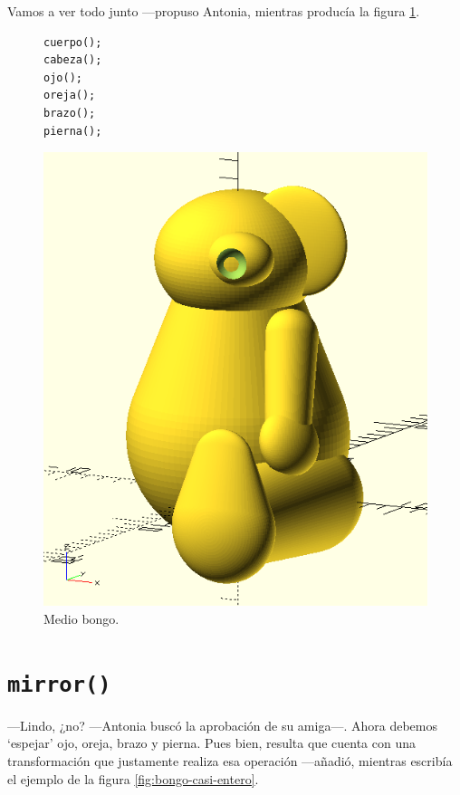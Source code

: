 \guillemotright Vamos a ver todo junto ---propuso Antonia, mientras
producía la figura \ref{fig:medio-bongo}.

  \begin{figure}[ht]
  \begin{minipage}[]{.4\textwidth}
    \begin{lstlisting}
cuerpo();
cabeza();
ojo();
oreja();
brazo();
pierna();
\end{lstlisting}
\end{minipage}
\begin{minipage}[]{.45\textwidth}
  \centering
  \includegraphics[width=\textwidth]{imagenes/medio-bongo}
\end{minipage}
\caption{Medio bongo.}
  \label{fig:medio-bongo}
\end{figure}


\section{\texttt{mirror()}}


---Lindo, ¿no? ---Antonia buscó la aprobación de su a\-mi\-ga---. Ahora
debemos `espejar' ojo, oreja, brazo y pierna. Pues bien, resulta que
\openscad{} cuenta con una transformación que justamente realiza esa
operación ---añadió, mientras escribía el ejemplo de la figura
\ref{fig:bongo-casi-entero}.

